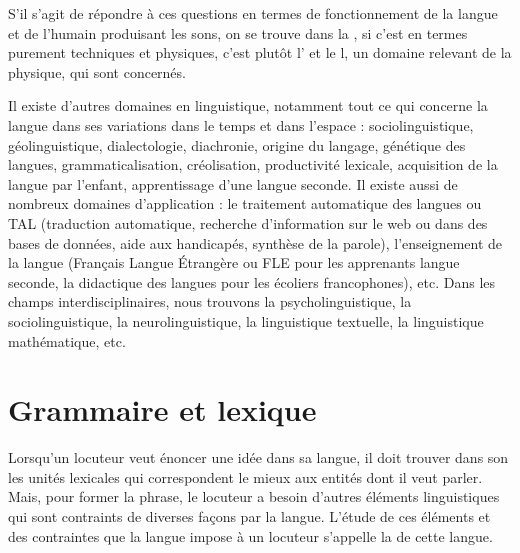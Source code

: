 {    S’il s’agit de répondre à ces questions en termes de fonctionnement de la langue et de l’humain produisant les sons, on se trouve dans la , si c’est en termes purement techniques et physiques, c’est plutôt l’ et le l, un domaine relevant de la physique, qui sont concernés.

    Il existe d’autres domaines en linguistique, notamment tout ce qui concerne la langue dans ses variations dans le temps et dans l’espace : sociolinguistique, géolinguistique, dialectologie, diachronie, origine du langage, génétique des langues, grammaticalisation, créolisation, productivité lexicale, acquisition de la langue par l’enfant, apprentissage d’une langue seconde. Il existe aussi de nombreux domaines d’application : le traitement automatique des langues ou TAL (traduction automatique, recherche d’information sur le web ou dans des bases de données, aide aux handicapés, synthèse de la parole), l’enseignement de la langue (Français Langue Étrangère ou FLE pour les apprenants langue seconde, la didactique des langues pour les écoliers francophones), etc. Dans les champs interdisciplinaires, nous trouvons la psycholinguistique, la sociolinguistique, la neurolinguistique, la linguistique textuelle, la linguistique mathématique, etc.
}

\section{Grammaire et lexique}\label{sec:0.0.5}

Lorsqu’un locuteur veut énoncer une idée dans sa langue, il doit trouver dans son  les unités lexicales qui correspondent le mieux aux entités dont il veut parler. Mais, pour former la phrase, le locuteur a besoin d’autres éléments linguistiques qui sont contraints de diverses façons par la langue. L’étude de ces éléments et des contraintes que la langue impose à un locuteur s’appelle la  de cette langue.

